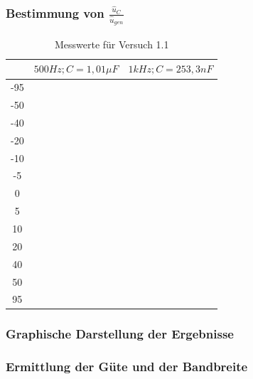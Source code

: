 \documentclass{article}
\begin{document}
\subsubsection{Bestimmung von $\frac{\hat{u}_C}{\hat{u}_{gen}}$}

\begin{table}[h]
  \begin{center}

    \begin{tabular}{|c|c|c|}
      \hline
          & $500Hz; C=1,01\mu F$ & $1kHz; C= 253,3 nF$ \\
      \hline
      -95 &                      &                     \\
      \hline
      -50 &                      &                     \\
      \hline
      -40 &                      &                     \\
      \hline
      -20 &                      &                     \\
      \hline
      -10 &                      &                     \\
      \hline
      -5  &                      &                     \\
      \hline
      0   &                      &                     \\
      \hline
      5   &                      &                     \\
      \hline
      10  &                      &                     \\
      \hline
      20  &                      &                     \\
      \hline
      40  &                      &                     \\
      \hline
      50  &                      &                     \\
      \hline
      95  &                      &                     \\
      \hline
    \end{tabular}
    \caption{Messwerte für Versuch 1.1}
    \label{tab:MV}
  \end{center}
\end{table}

\subsubsection{Graphische Darstellung der Ergebnisse}

\subsubsection{Ermittlung der Güte und der Bandbreite}
\end{document}
